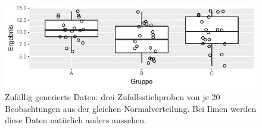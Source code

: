 \documentclass[oneside, 10pt]{book}\usepackage[]{graphicx}\usepackage[]{xcolor}
\newenvironment{knitrout}{}{} %
\begin{document}
\begin{knitrout}
\color{fgcolor}\begin{figure}[tp]

{\centering \includegraphics[width=.6\textwidth]{figs/unnamed-chunk-376-1} 

}

\caption{Zufällig generierte Daten: drei Zufallsstichproben von je 20 Beobachtungen aus der gleichen Normalverteilung. Bei Ihnen werden diese Daten natürlich anders aussehen.\label{fig:anova_zufallsdaten}}\label{fig:unnamed-chunk-376}
\end{figure}

\end{knitrout}
\end{document}
